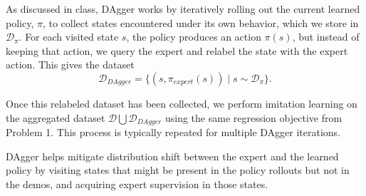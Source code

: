 \documentclass[12pt]{article}
\begin{document}
As discussed in class, DAgger works by iteratively rolling out the current learned policy, $\pi$, to collect states encountered under its own behavior, which we store in $\mathcal{D}_\pi$. For each visited state $s$, the policy produces an action $\pi(s)$, but instead of keeping that action, we query the expert and relabel the state with the expert action. This gives the dataset
$$
\mathcal{D}_{\textit{DAgger}} = \{ (s, \pi_{\textit{expert}}(s)) \mid s \sim \mathcal{D}_{\pi} \}.
$$

Once this relabeled dataset has been collected, we perform imitation learning on the aggregated dataset $\mathcal{D} \bigcup \mathcal{D}_{\textit{DAgger}}$ using the same regression objective from Problem 1. This process is typically repeated for multiple DAgger iterations.

DAgger helps mitigate distribution shift between the expert and the learned policy by visiting states that might be present in the policy rollouts but not in the demos, and acquiring expert supervision in those states.
\end{document}
